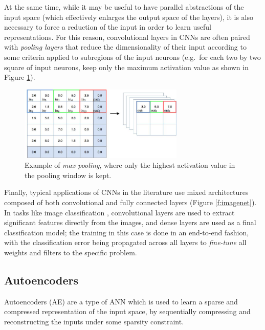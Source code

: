 At the same time, while it may be useful to have parallel abstractions of the 
input space (which effectively enlarges the output space of the layers), it is
also necessary to force a reduction of the input in order to learn useful 
representations. 
For this reason, convolutional layers in CNNs are often paired with 
\textit{pooling layers} that reduce the dimensionality of their input according
to some criteria applied to subregions of the input neurons (e.g.\ for each two 
by two square of input neurons, keep only the maximum activation value as 
shown in Figure \ref{f:max-pooling}).
%
\begin{figure}
    \includegraphics[width=0.7\textwidth]{pictures/max-pooling}
    \centering
    \caption[Max pooling]{Example of \textit{max pooling}, where only the 
	    highest activation value in the pooling window is kept.}
    \label{f:max-pooling}
\end{figure}
%

Finally, typical applications of CNNs in the literature use mixed 
architectures composed of both convolutional and fully connected layers (Figure 
\ref{f:imagenet}).
In tasks like image classification \cite{simonyan2014vggnet, szegedy2015going}, 
convolutional layers are used to extract significant features directly from the 
images, and dense layers are used as a final classification model; the training 
in this case is done in an end-to-end fashion, with the classification error 
being propagated across all layers to \textit{fine-tune} all weights and filters
to the specific problem.

\subsection{Autoencoders} \label{s:AE}
Autoencoders (AE) are a type of ANN which is used to learn a sparse and 
compressed representation of the input space, by sequentially compressing and 
reconstructing the inputs under some sparsity constraint.

